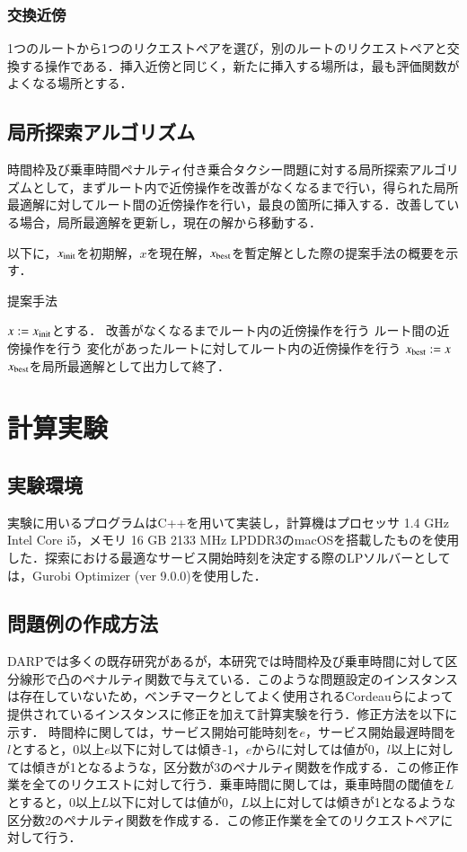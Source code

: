 \documentclass[a4j,11pt,twocolumn]{jsarticle}
\begin{document}
\subsubsection{交換近傍}
1つのルートから1つのリクエストペアを選び，別のルートのリクエストペアと交換する操作である．挿入近傍と同じく，新たに挿入する場所は，最も評価関数がよくなる場所とする．
\subsection{局所探索アルゴリズム}
時間枠及び乗車時間ペナルティ付き乗合タクシー問題に対する局所探索アルゴリズムとして，まずルート内で近傍操作を改善がなくなるまで行い，得られた局所最適解に対してルート間の近傍操作を行い，最良の箇所に挿入する．改善している場合，局所最適解を更新し，現在の解から移動する．

以下に，$x_{\rm init}$を初期解，$x$を現在解，$x_{\rm best}$を暫定解とした際の提案手法の概要を示す．
\begin{algorithm}
 \caption{提案手法}
 \label{algo1}
 \begin{algorithmic}[1]%
  \STATE $x := x_{\rm init}$とする．
  \STATE 改善がなくなるまでルート内の近傍操作を行う
  \STATE ルート間の近傍操作を行う
  \STATE 変化があったルートに対してルート内の近傍操作を行う
  \STATE  $x_{\rm best} := x$
  \ENDIF
  \STATE $x_{\rm best}$を局所最適解として出力して終了．
 \end{algorithmic}
\end{algorithm}

\section{計算実験}
\subsection{実験環境}
実験に用いるプログラムはC++を用いて実装し，計算機はプロセッサ 1.4 GHz Intel Core i5，メモリ 16 GB 2133 MHz LPDDR3のmacOSを搭載したものを使用した．探索における最適なサービス開始時刻を決定する際のLPソルバーとしては，Gurobi Optimizer (ver 9.0.0)を使用した．

\subsection{問題例の作成方法}
DARPでは多くの既存研究があるが，本研究では時間枠及び乗車時間に対して区分線形で凸のペナルティ関数で与えている．このような問題設定のインスタンスは存在していないため，ベンチマークとしてよく使用されるCordeauらによって提供されている\cite{tabu}インスタンスに修正を加えて計算実験を行う．修正方法を以下に示す．
時間枠に関しては，サービス開始可能時刻を$e$，サービス開始最遅時間を$l$とすると，0以上$e$以下に対しては傾き-1，$e$から$l$に対しては値が0，$l$以上に対しては傾きが1となるような，区分数が3のペナルティ関数を作成する．この修正作業を全てのリクエストに対して行う．乗車時間に関しては，乗車時間の閾値を$L$とすると，0以上$L$以下に対しては値が0，$L$以上に対しては傾きが1となるような区分数2のペナルティ関数を作成する．この修正作業を全てのリクエストペアに対して行う．
\end{document}
